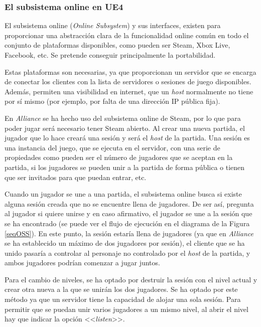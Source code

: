 \subsubsection{El subsistema online en \ac{UE4}}

El subsistema online (\textit{Online Subsystem}) y sus interfaces, existen para proporcionar una abstracción clara de la funcionalidad online común en todo el conjunto de plataformas disponibles, como pueden ser Steam, Xbox Live, Facebook, etc. Se pretende conseguir principalmente la portabilidad.

Estas plataformas son necesarias, ya que proporcionan un servidor que se encarga de conectar los clientes con la lista de servidores o sesiones de juego disponibles. Además, permiten una visibilidad en internet, que un \textit{host} normalmente no tiene por sí mismo (por ejemplo, por falta de una dirección IP pública fija).

En \textit{Alliance} se ha hecho uso del subsistema online de Steam, por lo que para poder jugar será necesario tener Steam abierto. Al crear una nueva partida, el jugador que lo hace creará una sesión y será el \textit{host} de la partida. Una sesión es una instancia del juego, que se ejecuta en el servidor, con una serie de propiedades como pueden ser el número de jugadores que se aceptan en la partida, si los jugadores se pueden unir a la partida de forma pública o tienen que ser invitados para que puedan entrar, etc. 

Cuando un jugador se une a una partida, el subsistema online busca si existe alguna sesión creada que no se encuentre llena de jugadores. De ser así, pregunta al jugador si quiere unirse y en caso afirmativo, el jugador se une a la sesión que se ha encontrado (se puede ver el flujo de ejecución en el diagrama de la Figura \ref{seqOSS}). En este punto, la sesión estaría llena de jugadores (ya que en \textit{Alliance} se ha establecido un máximo de dos jugadores por sesión), el cliente que se ha unido pasaría a controlar al personaje no controlado por el \textit{host} de la partida, y ambos jugadores podrían comenzar a jugar juntos.

Para el cambio de niveles, se ha optado por destruir la sesión con el nivel actual y crear otra nueva a la que se unirán los dos jugadores. Se ha optado por este método ya que un servidor tiene la capacidad de alojar una sola sesión. Para permitir que se puedan unir varios jugadores a un mismo nivel, al abrir el nivel hay que indicar la opción <<\textit{listen}>>.

